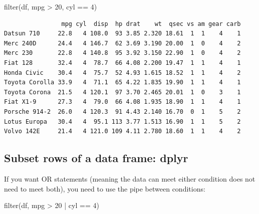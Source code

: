 \documentclass[
]{article}
\newenvironment{Shaded}{\begin{snugshade}}{\end{snugshade}}
\newcommand{\DecValTok}[1]{\textcolor[rgb]{0.00,0.00,0.81}{#1}}
\newcommand{\FunctionTok}[1]{\textcolor[rgb]{0.00,0.00,0.00}{#1}}
\newcommand{\NormalTok}[1]{#1}
\newcommand{\SpecialCharTok}[1]{\textcolor[rgb]{0.00,0.00,0.00}{#1}}
\begin{document}
\begin{Shaded}
\begin{Highlighting}[]
\FunctionTok{filter}\NormalTok{(df, mpg }\SpecialCharTok{\textgreater{}} \DecValTok{20}\NormalTok{, cyl }\SpecialCharTok{==} \DecValTok{4}\NormalTok{)}
\end{Highlighting}
\end{Shaded}

\begin{verbatim}
                mpg cyl  disp  hp drat    wt  qsec vs am gear carb
Datsun 710     22.8   4 108.0  93 3.85 2.320 18.61  1  1    4    1
Merc 240D      24.4   4 146.7  62 3.69 3.190 20.00  1  0    4    2
Merc 230       22.8   4 140.8  95 3.92 3.150 22.90  1  0    4    2
Fiat 128       32.4   4  78.7  66 4.08 2.200 19.47  1  1    4    1
Honda Civic    30.4   4  75.7  52 4.93 1.615 18.52  1  1    4    2
Toyota Corolla 33.9   4  71.1  65 4.22 1.835 19.90  1  1    4    1
Toyota Corona  21.5   4 120.1  97 3.70 2.465 20.01  1  0    3    1
Fiat X1-9      27.3   4  79.0  66 4.08 1.935 18.90  1  1    4    1
Porsche 914-2  26.0   4 120.3  91 4.43 2.140 16.70  0  1    5    2
Lotus Europa   30.4   4  95.1 113 3.77 1.513 16.90  1  1    5    2
Volvo 142E     21.4   4 121.0 109 4.11 2.780 18.60  1  1    4    2
\end{verbatim}

\hypertarget{subset-rows-of-a-data-frame-dplyr-4}{%
\subsection{Subset rows of a data frame:
dplyr}\label{subset-rows-of-a-data-frame-dplyr-4}}

If you want OR statements (meaning the data can meet either condition
does not need to meet both), you need to use the pipe
\texttt{\textbar{}} between conditions:

\begin{Shaded}
\begin{Highlighting}[]
\FunctionTok{filter}\NormalTok{(df, mpg }\SpecialCharTok{\textgreater{}} \DecValTok{20} \SpecialCharTok{|}\NormalTok{ cyl }\SpecialCharTok{==} \DecValTok{4}\NormalTok{)}
\end{Highlighting}
\end{Shaded}
\end{document}
